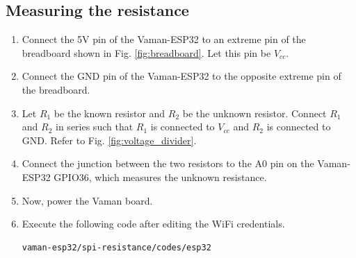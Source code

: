 \subsection{Measuring the resistance}
\begin{enumerate}[label=\thesection.\arabic*.,ref=\thesection.\theenumi]

\item
Connect the 5V pin of the Vaman-ESP32 to an extreme pin of the breadboard shown 
in Fig. \ref{fig:breadboard}. Let this pin be $V_{cc}$.
\item
Connect the GND pin of the Vaman-ESP32 to the opposite extreme pin of the 
breadboard.
\item
Let $R_1$ be the known resistor and $R_2$ be the unknown resistor. Connect $R_1$
and $R_2$ in series such that $R_1$ is connected to $V_{cc}$ and $R_2$ is 
connected to GND. Refer to Fig. \ref{fig:voltage_divider}.
\item
Connect the junction between the two resistors to the A0 pin on the Vaman-ESP32 
GPIO36, which measures the unknown resistance.
\item
Now, power the Vaman board.
\item
Execute the following code after editing the WiFi credentials.
\begin{lstlisting}
vaman-esp32/spi-resistance/codes/esp32
\end{lstlisting}
\end{enumerate}

